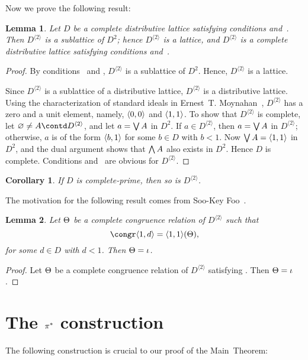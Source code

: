 \documentclass{amsart}
\theoremstyle{plain}
\newtheorem{corollary}{Corollary}
\newtheorem{lemma}{Lemma}
\theoremstyle{definition}
\theoremstyle{remark}
\numberwithin{equation}{section}
\newcommand{\Dsq}{D^{\langle2\rangle}}
\begin{document}
Now we prove the following result:

\begin{lemma}\label{L:Dsq} 
   Let $D$ be a complete distributive lattice satisfying 
   conditions  and~. 
   Then $\Dsq$ is a sublattice of $D^{2}$; hence $\Dsq$ is
   a lattice, and $\Dsq$ is a complete distributive lattice 
   satisfying conditions  and~. 
\end{lemma}

\begin{proof}
   By conditions~ and , $\Dsq$ is a 
   sublattice of $D^{2}$. Hence, $\Dsq$ is a lattice.

   Since $\Dsq$ is a sublattice of a distributive lattice, 
   $\Dsq$ is a distributive lattice. Using the characterization 
   of standard ideals in Ernest~T. Moynahan~\cite{eM57}, 
   $\Dsq$ has a zero and a unit element, namely, 
   $\vect<0, 0>$ and $\vect<1, 1>$. To show that $\Dsq$ is
   complete, let $\es \ne A \contd \Dsq$, and let $a = \bigvee A$
   in $D^{2}$. If $a \in \Dsq$, then 
   $a = \bigvee A$ in $\Dsq$; otherwise, $a$ is of the form 
   $\vect<b, 1>$ for some $b \in D$ with $b < 1$. Now 
   $\JJ A = \vect<1, 1>$ in $D^{2}$, and   
   the dual argument shows that $\bigwedge A$ also exists in 
   $D^{2}$. Hence $D$ is complete. Conditions  
   and~ are obvious for $\Dsq$. 
\end{proof}
\begin{corollary}\label{C:prime}
   If $D$ is complete-prime, then so is $\Dsq$.
\end{corollary}

The motivation for the following result comes from Soo-Key 
Foo~\cite{sF90}.

\begin{lemma}\label{L:ccr} 
   Let $\gQ$ be a complete congruence relation of $\Dsq$ such 
   that
   \begin{equation}\label{E:rigid}
      \congr \vect<1, d>=\vect<1, 1>(\gQ),
   \end{equation}
   for some $d \in D$ with $d < 1$. Then $\gQ = \gi$.
\end{lemma}

\begin{proof}
   Let $\gQ$ be a complete congruence relation of $\Dsq$ 
   satisfying . Then $\gQ = \gi$.
\end{proof}

\section{The $\gp^{*}$ construction}\label{S:P*} 
The following construction is crucial to our proof of the 
Main~Theorem:
\end{document}
